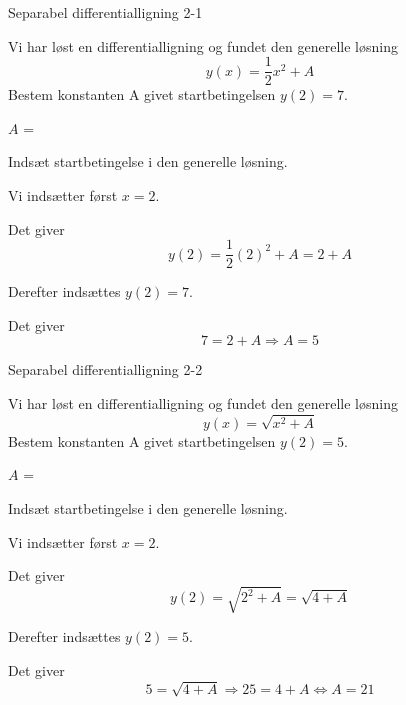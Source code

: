 \documentclass{article}
\begin{document}
\tableofcontents

\newpage

\begin{exercise}{Separabel differentialligning 2-1}

	
	Vi har løst en differentialligning og fundet den generelle løsning
	\[
	y(x) = \frac{1}{2}x^2 + A
	\]
	Bestem konstanten A givet startbetingelsen $y(2)=7$.
	
	$A$ = 
	
	\hint
	
	Indsæt startbetingelse i den generelle løsning. 

	
	\hint
	
	Vi indsætter først $x=2$.
	
	\hint
	
	Det giver
	\[
	y(2)= \frac{1}{2}(2)^2+A = 2 + A
	\]
	
	\hint
	
	Derefter indsættes $y(2)=7$.

	\hint 
	
	Det giver 
		\[
	7 = 2 + A \Rightarrow A = 5
	\]
	
\end{exercise}

\newpage

\begin{exercise}{Separabel differentialligning 2-2}

	
	Vi har løst en differentialligning og fundet den generelle løsning
	\[
	y(x) = \sqrt{x^2 + A}
	\]
	Bestem konstanten A givet startbetingelsen $y(2)=5$.
	
	$A$ = 
	
	\hint
	
	Indsæt startbetingelse i den generelle løsning. 
	
	
	\hint
	
	Vi indsætter først $x=2$.
	
	\hint
	
	Det giver
	\[
	y(2)= \sqrt{2^2 + A} = \sqrt{4 + A}
	\]
	
	\hint
	
	Derefter indsættes $y(2)=5$.
	
	\hint 
	
	Det giver 
	\[
	5 = \sqrt{4 + A} \Rightarrow 25 = 4 + A \Leftrightarrow A = 21	
	\]
	
\end{exercise}

\newpage
\end{document}
